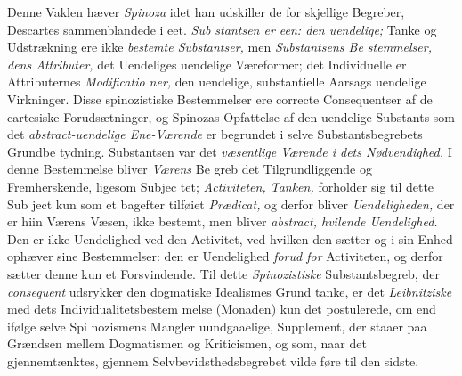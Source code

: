 Denne Vaklen hæver \emph{Spinoza} idet han udskiller de for\-%
skjellige Begreber, Descartes sammenblandede i eet. \emph{Sub\-%
stantsen er een: den uendelige;} Tanke og Udstrækning
ere ikke \emph{bestemte Substantser,} men \emph{Substantsens Be\-%
stemmelser, dens Attributer,} det Uendeliges uendelige
Væreformer; det Individuelle er Attributernes \emph{Modificatio\-%
ner,} den uendelige, substantielle Aarsags uendelige Virkninger.
Disse spinozistiske Bestemmelser ere correcte Consequentser af
de cartesiske Forudsætninger, og Spinozas Opfattelse af den
uendelige Substants som det \emph{abstract-uendelige Ene-Værende}
er begrundet i selve Substantsbegrebets Grundbe\-%
tydning. Substantsen var det \emph{væsentlige Værende i dets
Nødvendighed.} I denne Bestemmelse bliver \emph{Værens} Be\-%
greb det Tilgrundliggende og Fremherskende, ligesom Subjec\-%
tet; \emph{Activiteten, Tanken,} forholder sig til dette Sub\-%
ject kun som et bagefter tilføiet \emph{Prædicat,} og derfor
bliver \emph{Uendeligheden,} der er hiin Værens Væsen, ikke
bestemt, men bliver \emph{abstract, hvilende Uendelighed.}
Den er ikke Uendelighed ved den Activitet, ved hvilken den
sætter og i sin Enhed ophæver sine Bestemmelser: den er
Uendelighed \emph{forud for} Activiteten, og derfor sætter denne
kun et Forsvindende. Til dette \emph{Spinozistiske} Substantsbegreb,
der \emph{consequent} udsrykker den dogmatiske Idealismes Grund\-%
tanke, er det \emph{Leibnitziske} med dets Individualitetsbestem\-%
melse (Monaden) kun det postulerede, om end ifølge selve Spi\-%
nozismens Mangler uundgaaelige, Supplement, der staaer paa
Grændsen mellem Dogmatismen og Kriticismen, og som, naar
det gjennemtænktes, gjennem Selvbevidsthedsbegrebet vilde føre
til den sidste.

